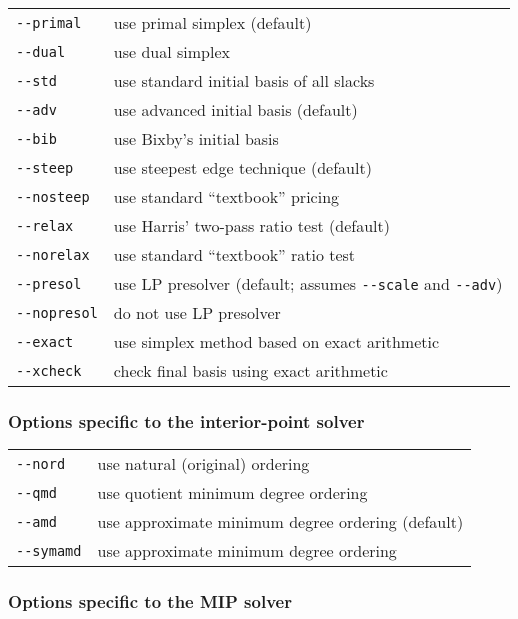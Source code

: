 \noindent
\begin{tabular}{@{}p{30mm}p{92.3mm}@{}}
\verb|--primal|   &  use primal simplex (default) \\
\verb|--dual|     &  use dual simplex \\
\verb|--std|      &  use standard initial basis of all slacks \\
\verb|--adv|      &  use advanced initial basis (default) \\
\verb|--bib|      &  use Bixby's initial basis\\
\verb|--steep|    &  use steepest edge technique (default) \\
\verb|--nosteep|  &  use standard ``textbook'' pricing \\
\verb|--relax|    &  use Harris' two-pass ratio test (default) \\
\verb|--norelax|  &  use standard ``textbook'' ratio test \\
\verb|--presol|   &  use LP presolver (default; assumes \verb|--scale|
                     and \verb|--adv|) \\
\verb|--nopresol| &  do not use LP presolver \\
\verb|--exact|    & use simplex method based on exact arithmetic \\
\verb|--xcheck|   & check final basis using exact arithmetic \\
\end{tabular}

\subsubsection*{Options specific to the interior-point solver}

\noindent
\begin{tabular}{@{}p{30mm}p{92.3mm}@{}}
\verb|--nord|     &  use natural (original) ordering \\
\verb|--qmd|      &  use quotient minimum degree ordering \\
\verb|--amd|      &  use approximate minimum degree ordering (default)\\
\verb|--symamd|   &  use approximate minimum degree ordering \\
\end{tabular}

\subsubsection*{Options specific to the MIP solver}

